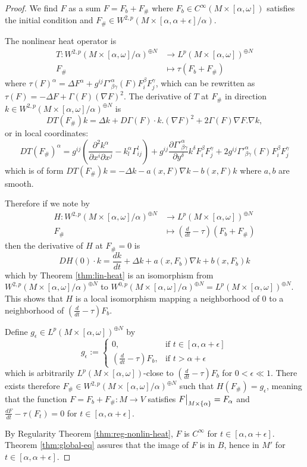\begin{proof}
We find \(F\) as a sum \(F = F_b + F_\#\) where \(F_b\in C^\infty(M\times
[\alpha,\omega])\) satisfies the initial condition and \(F_\# \in W^{2,p}(M\times
[\alpha,\alpha+\epsilon]/\alpha)\).

The nonlinear heat operator is
\begin{align*}
  T: W^{2,p}(M\times[\alpha,\omega]/\alpha)^{\oplus N} &\longrightarrow L^p(M\times[\alpha,\omega])^{\oplus N}\\
  	F_\#					       &\longmapsto \tau(F_b + F_\#)
\end{align*} 
where \(\tau(F)^\alpha = \Delta F^\alpha + g^{ij}\Gamma'^\alpha_{\beta\gamma}(F)
F^\beta_i F^\gamma_j\), which can be rewritten as \(\tau(F) = -\Delta F +
\Gamma(F)(\nabla F)^2\). The derivative of \(T\) at \(F_\#\) in direction \(k\in
W^{2,p}(M\times[\alpha,\omega]/\alpha)^{\oplus N}\) is
\[
 DT(F_\#) k = \Delta k +D \Gamma(F)\cdot k . (\nabla F)^2 + 2\Gamma(F) \nabla F. \nabla k,
\]
or in local coordinates:
\[
  DT(F_\#)^\alpha = g^{ij}\left( \frac{\partial^2 k^\alpha}{\partial x^i \partial x^j} - k^\alpha_l \Gamma^l_{ij} \right) + g^{ij} \frac{\partial \Gamma'^\alpha_{\beta\gamma}}{\partial y^\delta} k^\delta F^\beta_i F^\gamma_j + 2g^{ij} \Gamma'^\alpha_{\beta\gamma}(F) F^\beta_i F^\gamma_j 
\]
which is of form \(DT(F_\#) k = -\Delta k - a(x,F) \nabla k -b(x,F) k\) where \(a,b\)
are smooth.

Therefore if we note by 
\begin{align*}
  H: W^{2,p}(M\times[\alpha,\omega]/\alpha)^{\oplus N} &\longrightarrow L^p(M\times[\alpha,\omega])^{\oplus N}\\
  	F_\#					       &\longmapsto (\frac{d }{dt} - \tau)(F_b + F_\#)
\end{align*}
then the derivative of \(H\) at \(F_\# = 0\) is
\[
 DH(0)\cdot k = \frac{d k}{d t} + \Delta k + a(x, F_b) \nabla k + b(x, F_b) k
\]
which by Theorem \ref{thm:lin-heat} is an isomorphism from \(W^{2,p}(M\times[\alpha,\omega]/\alpha)^{\oplus N}\) to
\(W^{0,p}(M\times[\alpha,\omega]/\alpha)^{\oplus N} =  L^p(M\times[\alpha,\omega])^{\oplus
N}\). This shows that \(H\) is a local isomorphism mapping a neighborhood of \(0\) to
a neighborhood of \((\frac{d }{dt}-\tau)F_b\).

Define \(g_\epsilon\in L^p(M\times [\alpha,\omega])^{\oplus N}\) by 
\[
 g_\epsilon:= \begin{cases}
0	      ,  & \text{if $t\in[\alpha,\alpha+\epsilon]$} \\
(\frac{d }{dt}-\tau)F_b	      , & \text{if $t > \alpha+\epsilon$}
	      \end{cases}
\]
which is arbitrarily \(L^p(M\times[\alpha,\omega])\)-close to \((\frac{d }{dt}-\tau)F_b\) for \(0<\epsilon \ll 1\). There exists therefore \(F_\#\in W^{2,p}(M\times
[\alpha,\omega]/\alpha)^{\oplus N}\) such that \(H(F_\#) = g_\epsilon\), meaning that
the function \(F= F_b + F_\#: M \longrightarrow V\) satisfies \(\restr{F}{M\times\{\alpha\}} = F_\alpha\)
and \(\frac{d F}{d t} -\tau(F_t) = 0\) for \(t\in[\alpha,\alpha+\epsilon]\).

By Regularity Theorem \ref{thm:reg-nonlin-heat}, \(F\) is \(C^\infty\) for \(t\in[\alpha,\alpha+\epsilon]\). Theorem \ref{thm:global-eq} assures that the image of \(F\) is in \(B\), hence in \(M'\) for \(t\in [\alpha,\alpha+\epsilon]\).
\end{proof}
